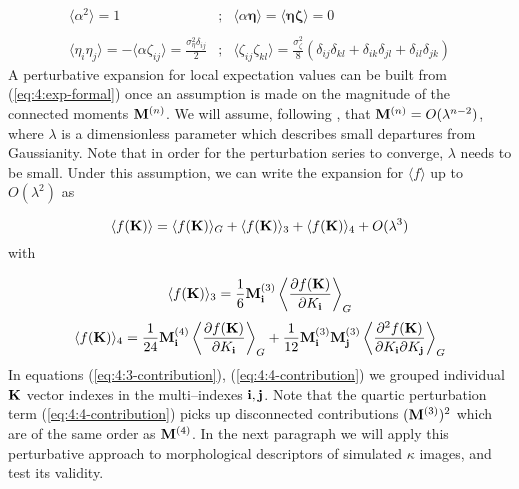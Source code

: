 \begin{equation}
\label{eq:4:cov-rotinv}
\begin{matrix}
\langle \alpha^2\rangle = 1 & ; & \langle \alpha \pmb{\eta} \rangle = \langle \pmb{\eta}\pmb{\zeta} \rangle = 0 \\ \\
\displaystyle \langle \eta_i\eta_j \rangle = -\langle \alpha \zeta_{ij} \rangle = \frac{\sigma_\eta^2 \delta_{ij}}{2} & ; & \displaystyle \langle \zeta_{ij}\zeta_{kl} \rangle = \frac{\sigma_\zeta^2}{8}(\delta_{ij}\delta_{kl}+\delta_{ik}\delta_{jl}+\delta_{il}\delta_{jk})
\end{matrix}
\end{equation}
%
A perturbative expansion for local expectation values can be built from (\ref{eq:4:exp-formal}) once an assumption is made on the magnitude of the connected moments $\mathbf{M}^{(n)}$. We will assume, following \citep{MatsubaraLong}, that $\mathbf{M}^{(n)}=O(\lambda^{n-2})$, where $\lambda$ is a dimensionless parameter which describes small departures from Gaussianity. Note that in order for the perturbation series to converge, $\lambda$ needs to be small. Under this assumption, we can write the expansion for $\langle f \rangle$ up to $O(\lambda^2)$ as 

\begin{equation}
\label{eq:4:pert-quad}
\langle f(\mathbf{K})\rangle = \langle f(\mathbf{K})\rangle_G + \langle f(\mathbf{K})\rangle_3 + \langle f(\mathbf{K})\rangle_4 + O(\lambda^3) 
\end{equation}
%
with 

\begin{equation}
\label{eq:4:3-contribution}
\langle f(\mathbf{K})\rangle_3 = \frac{1}{6}\mathbf{M}^{(3)}_{\mathbf{i}}\left\langle\frac{\partial f(\mathbf{K})}{\partial K_{\mathbf{i}}}\right\rangle_G
\end{equation}
%
\begin{equation}
\label{eq:4:4-contribution}
\langle f(\mathbf{K})\rangle_4 = \frac{1}{24}\mathbf{M}^{(4)}_{\mathbf{i}}\left\langle\frac{\partial f(\mathbf{K})}{\partial K_{\mathbf{i}}}\right\rangle_G+ \frac{1}{12}\mathbf{M}^{(3)}_{\mathbf{i}}\mathbf{M}^{(3)}_{\mathbf{j}}\left\langle\frac{\partial^2 f(\mathbf{K})}{\partial K_{\mathbf{i}}\partial K_{\mathbf{j}}}\right\rangle_G
\end{equation}
%
In equations (\ref{eq:4:3-contribution}), (\ref{eq:4:4-contribution}) we grouped individual $\mathbf{K}$ vector indexes in the multi--indexes $\mathbf{i},\mathbf{j}$. Note that the quartic perturbation term (\ref{eq:4:4-contribution}) picks up disconnected contributions $(\mathbf{M}^{(3)})^2$ which are of the same order as $\mathbf{M}^{(4)}$. In the next paragraph we will apply this perturbative approach to morphological descriptors of simulated $\kappa$ images, and test its validity.   


